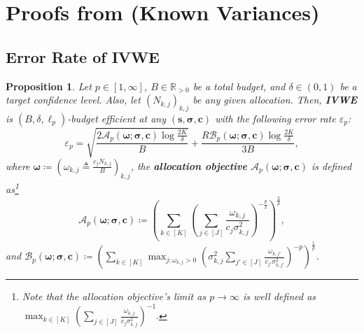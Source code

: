 \documentclass{article}
\def\vc{{\bm{c}}}
\def\vs{{\bm{s}}}
\def\gA{{\mathcal{A}}}
\def\gB{{\mathcal{B}}}
\def\sR{{\mathbb{R}}}
\theoremstyle{plain}
\newtheorem{proposition}[theorem]{Proposition}
\theoremstyle{definition}
\theoremstyle{plain}
\begin{document}
\newpage
\tableofcontents
\newpage
\section{\texorpdfstring{Proofs from  (Known Variances)}{Proofs from Section 3 (Known Variances)}}\label{app:known}

\subsection{Error Rate of \textbf{IVWE}}
\label{app:upper-bound-allocation}
\begin{proposition}
\label{prop:upper-bound-allocation}
    Let $p \in [1, \infty]$, $B \in \sR_{> 0}$ be a total budget, and $\delta \in (0, 1)$ be a target confidence level.
    Also, let $(N_{k,j})_{k,j}$ be any given allocation.
    Then, \textbf{IVWE} is $(B, \delta, \ell_p)$-budget efficient at any $(\vs, \bm\sigma, \vc)$ with the following error rate $\varepsilon_p$:
    \begin{equation}
        \varepsilon_p = \sqrt{\frac{2 \gA_p(\bm\omega; \bm\sigma, \vc) \log\frac{2K}{\delta}}{B}} + \frac{R 
        \gB_p(\bm\omega; \bm\sigma, \vc) \log\frac{2K}{\delta}}{3B},
    \end{equation}
    where $\bm\omega \coloneq \left( \omega_{k,j} \triangleq \frac{c_j N_{k,j}}{B} \right)_{k,j}$, the \textbf{allocation objective} $\gA_p(\bm\omega; \bm\sigma, \vc)$ is defined as\footnote{Note that the allocation objective's limit as $p \rightarrow \infty$ is well defined as $\max_{k \in [K]} \left( \sum_{j \in [J]} \frac{\omega_{k,j}}{c_j \sigma_{k,j}^2} \right)^{-1}.$}
    \begin{equation}
        \gA_p(\bm\omega; \bm\sigma, \vc) \coloneq \left( \sum_{k \in [K]} \left( \sum_{j \in [J]} \frac{\omega_{k,j}}{c_j \sigma_{k,j}^2} \right)^{-\frac{p}{2}} \right)^{\frac{2}{p}},
    \end{equation}
    and $\gB_p(\bm\omega; \bm\sigma, \vc) \coloneq \left( \sum_{k \in [K]} \max_{j: \omega_{k,j} > 0} \left( \sigma_{k,j}^2 \sum_{j'\in[J]} \frac{\omega_{k,j'}}{c_{j'} \sigma_{k,j'}^2} \right)^{-p} \right)^{\frac{1}{p}}$.
\end{proposition}
\end{document}
